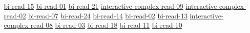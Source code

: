 \hyperref[sec:bi-read-15]{bi-read-15}
\hyperref[sec:bi-read-01]{bi-read-01}
\hyperref[sec:bi-read-21]{bi-read-21}
\hyperref[sec:interactive-complex-read-09]{interactive-complex-read-09}
\hyperref[sec:interactive-complex-read-02]{interactive-complex-read-02}
\hyperref[sec:bi-read-07]{bi-read-07}
\hyperref[sec:bi-read-24]{bi-read-24}
\hyperref[sec:bi-read-14]{bi-read-14}
\hyperref[sec:bi-read-02]{bi-read-02}
\hyperref[sec:bi-read-13]{bi-read-13}
\hyperref[sec:interactive-complex-read-08]{interactive-complex-read-08}
\hyperref[sec:bi-read-03]{bi-read-03}
\hyperref[sec:bi-read-18]{bi-read-18}
\hyperref[sec:bi-read-11]{bi-read-11}
\hyperref[sec:bi-read-10]{bi-read-10}
